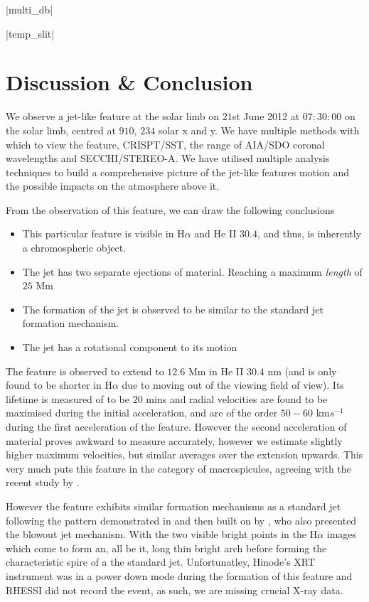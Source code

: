 \py[chapter5]|multi_db|

\py[chapter5]|temp_slit|

\section{Discussion \& Conclusion}

We observe a jet-like feature at the solar limb on $21$st June 2012 at $07:30:00$ on the solar limb, centred at $910$, $234$ solar x and y.
We have multiple methods with which to view the feature, CRISPT/SST, the range of AIA/SDO coronal wavelengths and SECCHI/STEREO-A.
We have utilised multiple analysis techniques to build a comprehensive picture of the jet-like features motion and the possible impacts on the atmosphere above it.

From the observation of this feature, we can draw the following conclusions
\begin{itemize}
	\item{This particular feature is visible in H$\alpha$ and He II $30.4$, and thus, is inherently a chromospheric object.}
	\item{The jet has two separate ejections of material. Reaching a maximum \emph{length} of $25$ Mm}
	\item{The formation of the jet is observed to be similar to the standard jet formation mechanism.}
	\item{The jet has a rotational component to its motion}
\end{itemize}

The feature is observed to extend to $12.6$ Mm in He II $30.4$ nm (and is only found to be shorter in H$\alpha$ due to moving out of the viewing field of view).
Its lifetime is measured of to be $20$ mins and radial velocities are found to be maximised during the initial acceleration, and are of the order $50 - 60$ km$s^{-1}$ during the first acceleration of the feature.
However the second acceleration of material proves awkward to measure accurately, however we estimate slightly higher maximum velocities, but similar averages over the extension upwards. 
This very much puts this feature in the category of macrospicules, agreeing with the recent study by \cite{Bennett2015}.

However the feature exhibits similar formation mechanisms as a standard jet following the pattern demonstrated in \cite{Shibata1992} and then built on by \cite{Moore2010}, who also presented the blowout jet mechanism.
With the two visible bright points in the H$\alpha$ images which come to form an, all be it, long thin bright arch before forming the characteristic spire of a the standard jet.
Unfortunatley, Hinode's XRT instrument was in a power down mode during the formation of this feature and RHESSI did not record the event, as such, we are missing crucial X-ray data.

